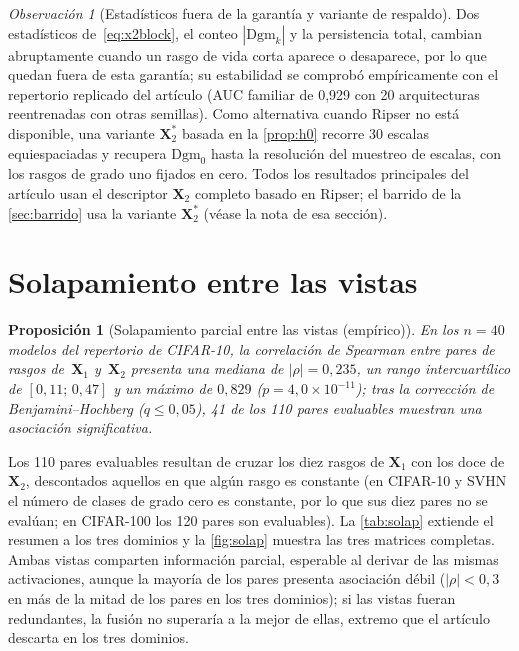 \documentclass[11pt,a4paper]{article}
\theoremstyle{plain}
\newtheorem{proposition}{Proposición}
\theoremstyle{remark}
\newtheorem{remark}{Observación}
\newcommand{\X}[1]{\mathbf{X}_{#1}}
\newcommand{\Dgm}[1]{\mathrm{Dgm}_{#1}}
\begin{document}
\begin{remark}[Estadísticos fuera de la garantía y variante de respaldo]
Dos estadísticos de~\eqref{eq:x2block}, el conteo $|\Dgm{k}|$ y la persistencia total, cambian abruptamente cuando un rasgo de vida corta aparece o desaparece, por lo que quedan fuera de esta garantía; su estabilidad se comprobó empíricamente con el repertorio replicado del artículo (AUC familiar de 0,929 con 20 arquitecturas reentrenadas con otras semillas). Como alternativa cuando Ripser no está disponible, una variante $\X{2}^*$ basada en la \cref{prop:h0} recorre 30 escalas equiespaciadas y recupera $\Dgm{0}$ hasta la resolución del muestreo de escalas, con los rasgos de grado uno fijados en cero. Todos los resultados principales del artículo usan el descriptor $\X{2}$ completo basado en Ripser; el barrido de la \cref{sec:barrido} usa la variante $\X{2}^*$ (véase la nota de esa sección).
\end{remark}

\section{Solapamiento entre las vistas}
\label{sec:solap}

\begin{proposition}[Solapamiento parcial entre las vistas (empírico)]
\label{prop:overlap}
En los $n{=}40$ modelos del repertorio de CIFAR-10, la correlación de Spearman entre pares de rasgos de~$\X{1}$ y~$\X{2}$ presenta una mediana de $|\rho|{=}0{,}235$, un rango intercuartílico de $[0{,}11;\,0{,}47]$ y un máximo de $0{,}829$ ($p{=}4{,}0{\times}10^{-11}$); tras la corrección de Benjamini--Hochberg ($q{\le}0{,}05$), 41 de los 110 pares evaluables muestran una asociación significativa.
\end{proposition}

Los 110 pares evaluables resultan de cruzar los diez rasgos de $\X{1}$ con los doce de $\X{2}$, descontados aquellos en que algún rasgo es constante (en CIFAR-10 y SVHN el número de clases de grado cero es constante, por lo que sus diez pares no se evalúan; en CIFAR-100 los 120 pares son evaluables). La \cref{tab:solap} extiende el resumen a los tres dominios y la \cref{fig:solap} muestra las tres matrices completas. Ambas vistas comparten información parcial, esperable al derivar de las mismas activaciones, aunque la mayoría de los pares presenta asociación débil ($|\rho|<0{,}3$ en más de la mitad de los pares en los tres dominios); si las vistas fueran redundantes, la fusión no superaría a la mejor de ellas, extremo que el artículo descarta en los tres dominios.
\end{document}
